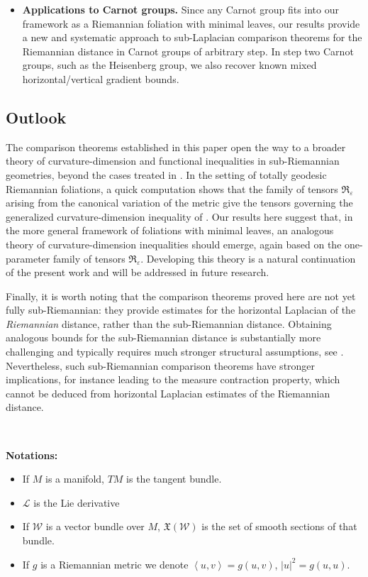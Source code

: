 \documentclass[11pt]{article}
\numberwithin{equation}{section}
\begin{document}
\begin{itemize}
    \item \textbf{Applications to Carnot groups.}
    Since any Carnot group fits into our framework as a Riemannian foliation
    with minimal leaves, our results provide a new and systematic approach to
    sub-Laplacian comparison theorems for the Riemannian distance in Carnot groups of arbitrary step. In
    step two Carnot groups, such as the Heisenberg group, we also recover known
    mixed horizontal/vertical gradient bounds.
\end{itemize}

\subsection*{Outlook}

The comparison theorems established in this paper open the way to a broader
theory of curvature-dimension and functional inequalities in sub-Riemannian
geometries, beyond the cases treated in \cite{BBG14,BG170}. In the setting
of totally geodesic Riemannian foliations, a quick computation shows that the family of
tensors $\mathfrak{R}_\varepsilon$ arising from the canonical variation of the
metric give the tensors governing the generalized curvature-dimension
inequality of \cite{BBG14}. Our results here suggest that, in the more general
framework of foliations with minimal leaves, an analogous theory of
curvature-dimension inequalities should emerge, again based on the
one-parameter family of tensors $\mathfrak{R}_\varepsilon$. Developing this
theory is a natural continuation of the present work and will be addressed in
future research.

\medskip

Finally, it is worth noting that the comparison theorems proved here are not yet
fully sub-Riemannian: they provide estimates for the horizontal Laplacian of
the \emph{Riemannian} distance, rather than the sub-Riemannian distance.
Obtaining analogous bounds for the sub-Riemannian distance is substantially more
challenging and typically requires much stronger structural assumptions, see
\cite{baudoin2019comparison}. Nevertheless, such sub-Riemannian comparison
theorems have stronger implications, for instance leading to the measure
contraction property, which cannot be deduced from horizontal Laplacian
estimates of the Riemannian distance.

\

\textbf{Notations:}

\begin{itemize}
\item If $M$ is a manifold, $TM$ is the tangent bundle.
\item $\mathcal{L}$ is the Lie derivative
 \item If $\mathcal{W}$ is a vector bundle over $M$, $\mathfrak{X}(\mathcal{W})$ is the set of smooth sections of that bundle.
 \item If $g$ is a Riemannian metric we denote $\left\langle u, v \right\rangle=g(u,v)$, $|u|^2=g(u,u)$.
\end{itemize}
\end{document}
